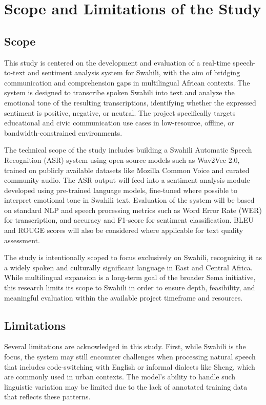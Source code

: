 \section{Scope and Limitations of the Study}
\subsection{Scope}
This study is centered on the development and evaluation of a real-time speech-to-text and sentiment analysis system for Swahili, with the aim of bridging communication and comprehension gaps in multilingual African contexts. The system is designed to transcribe spoken Swahili into text and analyze the emotional tone of the resulting transcriptions, identifying whether the expressed sentiment is positive, negative, or neutral. The project specifically targets educational and civic communication use cases in low-resource, offline, or bandwidth-constrained environments.

\noindent The technical scope of the study includes building a Swahili Automatic Speech Recognition (ASR) system using open-source models such as Wav2Vec 2.0, trained on publicly available datasets like Mozilla Common Voice and curated community audio. The ASR output will feed into a sentiment analysis module developed using pre-trained language models, fine-tuned where possible to interpret emotional tone in Swahili text. Evaluation of the system will be based on standard NLP and speech processing metrics such as Word Error Rate (WER) for transcription, and accuracy and F1-score for sentiment classification. BLEU and ROUGE scores will also be considered where applicable for text quality assessment.

\noindent The study is intentionally scoped to focus exclusively on Swahili, recognizing it as a widely spoken and culturally significant language in East and Central Africa. While multilingual expansion is a long-term goal of the broader Sema initiative, this research limits its scope to Swahili in order to ensure depth, feasibility, and meaningful evaluation within the available project timeframe and resources.

\subsection{Limitations}
Several limitations are acknowledged in this study. First, while Swahili is the focus, the system may still encounter challenges when processing natural speech that includes code-switching with English or informal dialects like Sheng, which are commonly used in urban contexts. The model’s ability to handle such linguistic variation may be limited due to the lack of annotated training data that reflects these patterns.

